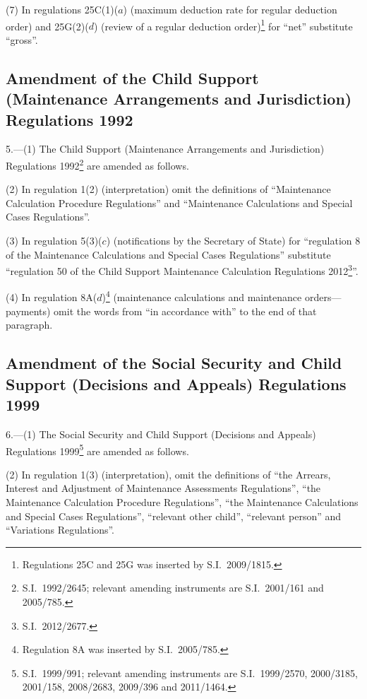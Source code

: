 \documentclass[12pt,a4paper]{article}
\begin{document}
(7) In regulations 25C(1)($a$)  (maximum deduction rate for regular deduction order) and 25G(2)($d$)  (review of a regular deduction order)\footnote{Regulations 25C and 25G was inserted by S.I.~2009/1815.} for “net” substitute “gross”.

\subsection[5. Amendment of the Child Support (Maintenance Arrangements and Jurisdiction) Regulations 1992]{\sloppy Amendment of the Child Support (Maintenance Arrangements and Jurisdiction) Regulations 1992}

5.---(1)  The Child Support (Maintenance Arrangements and Jurisdiction) Regulations 1992\footnote{S.I.~1992/2645; relevant amending instruments are S.I.~2001/161 and 2005/785.} are amended as follows.

(2) In regulation 1(2) (interpretation) omit the definitions of “Maintenance Calculation Procedure Regulations” and “Maintenance Calculations and Special Cases Regulations”.

(3) In regulation 5(3)($c$)  (notifications by the Secretary of State) for “regulation 8 of the Maintenance Calculations and Special Cases Regulations” substitute “regulation 50 of the Child Support Maintenance Calculation Regulations 2012\footnote{S.I.~2012/2677.}”.

(4) In regulation 8A($d$)\footnote{Regulation 8A was inserted by S.I.~2005/785.} (maintenance calculations and maintenance orders---payments) omit the words from “in accordance with” to the end of that paragraph.

\subsection[6. Amendment of the Social Security and Child Support (Decisions and Appeals) Regulations 1999]{Amendment of the Social Security and Child Support (Decisions and Appeals) Regulations 1999}

6.---(1)  The Social Security and Child Support (Decisions and Appeals) Regulations 1999\footnote{S.I.~1999/991; relevant amending instruments are S.I.~1999/2570, 2000/3185, 2001/158, 2008/2683, 2009/396 and 2011/1464.} are amended as follows.

(2) In regulation 1(3) (interpretation), omit the definitions of “the Arrears, Interest and Adjustment of Maintenance Assessments Regulations”, “the Maintenance Calculation Procedure Regulations”, “the Maintenance Calculations and Special Cases Regulations”, “relevant other child”, “relevant person” and “Variations Regulations”.
\end{document}
